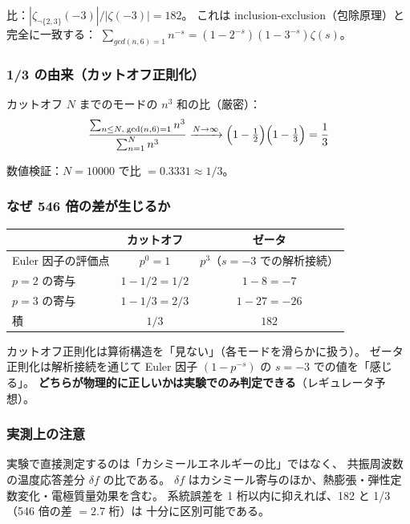 \documentclass[11pt,a4paper]{article}
\begin{document}
比：$|\zeta_{\neg\{2,3\}}(-3)| / |\zeta(-3)| = 182$。
これは inclusion-exclusion（包除原理）と完全に一致する：
$\sum_{gcd(n,6)=1} n^{-s} = (1-2^{-s})(1-3^{-s})\zeta(s)$。

\subsubsection{1/3 の由来（カットオフ正則化）}

カットオフ $N$ までのモードの $n^3$ 和の比（厳密）：
\begin{equation}
  \frac{\sum_{n \leq N,\; \gcd(n,6)=1} n^3}{\sum_{n=1}^N n^3}
  \xrightarrow{N \to \infty}
  \Bigl(1 - \tfrac{1}{2}\Bigr)\Bigl(1 - \tfrac{1}{3}\Bigr) = \frac{1}{3}
\end{equation}

数値検証：$N = 10000$ で比 $= 0.3331 \approx 1/3$。

\subsubsection{なぜ 546 倍の差が生じるか}

\begin{center}
\begin{tabular}{lcc}
\toprule
& カットオフ & ゼータ \\
\midrule
Euler 因子の評価点 & $p^0 = 1$ & $p^3$（$s = -3$ での解析接続） \\
$p = 2$ の寄与 & $1 - 1/2 = 1/2$ & $1 - 8 = -7$ \\
$p = 3$ の寄与 & $1 - 1/3 = 2/3$ & $1 - 27 = -26$ \\
積 & $1/3$ & $182$ \\
\bottomrule
\end{tabular}
\end{center}

カットオフ正則化は算術構造を「見ない」（各モードを滑らかに扱う）。
ゼータ正則化は解析接続を通じて Euler 因子 $(1-p^{-s})$ の $s=-3$ での値を「感じる」。
\textbf{どちらが物理的に正しいかは実験でのみ判定できる}（レギュレータ予想）。

\subsubsection{実測上の注意}

実験で直接測定するのは「カシミールエネルギーの比」ではなく、
共振周波数の温度応答差分 $\delta f$ の比である。
$\delta f$ はカシミール寄与のほか、熱膨張・弾性定数変化・電極質量効果を含む。
系統誤差を 1 桁以内に抑えれば、182 と 1/3（546 倍の差 $= 2.7$ 桁）は
十分に区別可能である。
\end{document}
